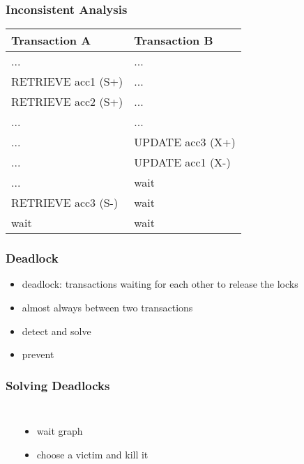 \documentclass[dvipsnames]{beamer}
\theoremstyle{plain}
\begin{document}
\begin{frame}[fragile]
  \frametitle{Inconsistent Analysis}

  \begin{table}
    \begin{tabular}{ll}
Transaction A        & Transaction B   \\\hline
...                  & ...             \\\pause
RETRIEVE acc1 (S+)   & ...             \\\pause
RETRIEVE acc2 (S+)   & ...             \\\pause
...                  & ...             \\
...                  & UPDATE acc3 (X+)\\\pause
...                  & UPDATE acc1 (X-)\\
...                  & wait            \\\pause
RETRIEVE acc3 (S-)   & wait            \\
wait                 & wait
    \end{tabular}
  \end{table}
\end{frame}

\begin{frame}
  \frametitle{Deadlock}

  \begin{itemize}
    \item \alert{deadlock}: transactions waiting for each other to release the locks
    \item almost always between two transactions

    \medskip
    \item detect and solve
    \item prevent
  \end{itemize}
\end{frame}

\begin{frame}
  \frametitle{Solving Deadlocks}

  \begin{columns}[t]
    \begin{example}
      \begin{center}
      \end{center}
    \end{example}

    \begin{itemize}
      \item wait graph
      \item choose a \alert{victim} and kill it
    \end{itemize}
  \end{columns}
\end{frame}
\end{document}
